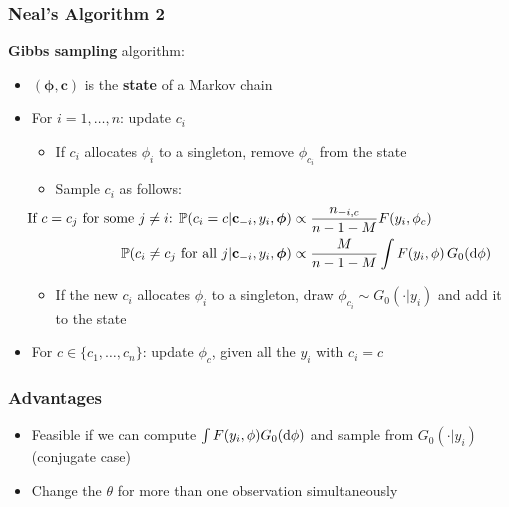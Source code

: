 \begin{frame} %
	\frametitle{Neal's Algorithm 2}
	\textbf{Gibbs sampling} algorithm:
	\begin{itemize}
		\item $(\boldsymbol\phi, \mathbf c)$ is the \textbf{state} of a Markov chain
	    \item For $i= 1,\dots,n$: update $c_{i}$
	    \begin{itemize}
	        \item If $c_{i}$ allocates $\phi_i$ to a singleton, remove $\phi_{c_{i}}$ from the state
		    \item Sample $c_i$ as follows:
	        \begin{align*}
		        \hspace{-35pt}
                \text{If $c=c_j$ for some $j\neq i$: } \PP(c_{i}=c | \mathbf c_{-i}, y_{i},\boldsymbol\phi) &\propto \frac{n_{-i,c}}{n-1-M} F(y_{i},\phi_{c}) \\
                \PP(c_{i}\neq c_{j} \text{ for all } j | \mathbf c_{-i}, y_{i},\boldsymbol\phi) &\propto \frac{M }{n-1-M} \int F(y_{i},\phi) \, G_0(\de\phi)
            \end{align*}
            \item If the new $c_{i}$ allocates $\phi_i$ to a singleton, draw $\phi_{c_{i}} \sim G_0(\cdot|y_i)$ and add it to the state
        \end{itemize} 
        
       	\item For $c \in \{c_{1},\dots,c_{n}\}$: update $\phi_{c}$, given all the $y_{i}$ with $c_{i}=c$
	\end{itemize}
		
\end{frame}


\begin{frame}
	\frametitle{Advantages}
	\begin{itemize}
	    \item Feasible if we can compute $\int F(y_i,\phi) G_0(\mathrm d\phi)$ and sample from $G_0(\cdot|y_i)$ (conjugate case)
	    \item Change the $\theta$ for more than one observation simultaneously
	\end{itemize}
\end{frame}



